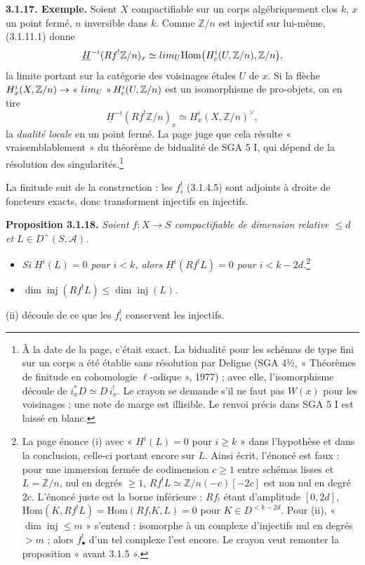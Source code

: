 \documentclass[11pt,a4paper]{article}
\begin{document}
\textbf{3.1.17. Exemple.} Soient $X$ compactifiable sur un corps
algébriquement clos $k$, $x$ un point fermé, $n$ inversible dans $k$. Comme
$\mathbb{Z}/n$ est injectif sur lui-même, (3.1.11.1) donne
\[
\underline{H}^{-i}(Rf^!\mathbb{Z}/n)_x \simeq \varinjlim_{U}
\mathrm{Hom}\bigl(H^i_c(U, \mathbb{Z}/n), \mathbb{Z}/n\bigr),
\]
la limite portant sur la catégorie des voisinages étales $U$ de $x$. Si
la flèche $H^i_x(X, \mathbb{Z}/n) \to \text{« }\varprojlim_U\text{ »}\,
H^i_c(U, \mathbb{Z}/n)$ est un isomorphisme de pro-objets, on en tire
\[
\underline{H}^{-i}(Rf^!\mathbb{Z}/n)_x \simeq H^i_x(X, \mathbb{Z}/n)^{\vee},
\]
la \emph{dualité locale} en un point fermé. La page juge que cela résulte
« vraisemblablement » du théorème de bidualité de SGA 5 I, qui dépend de la
résolution des singularités.\footnote{À la date de la page, c'était exact.
La bidualité pour les schémas de type fini sur un corps a été établie sans
résolution par Deligne (SGA 4½, « Théorèmes de finitude en cohomologie
$\ell$-adique », 1977) ; avec elle, l'isomorphisme découle de $i_x^*D \simeq
D\,i_x^!$. Le crayon se demande s'il ne faut pas $W(x)$ pour les voisinages ;
une note de marge est illisible. Le renvoi précis dans SGA 5 I est laissé en
blanc.}

La finitude suit de la construction : les $f^!_i$ (3.1.4.5) sont adjoints à
droite de foncteurs exacts, donc transforment injectifs en injectifs.

\textbf{Proposition 3.1.18.} \emph{Soient $f\colon X \to S$ compactifiable
de dimension relative $\leqslant d$ et $L \in D^+(S, \mathcal{A})$.}
\begin{itemize}
\item[(i)] \emph{Si $\underline{H}^i(L) = 0$ pour $i < k$, alors
$\underline{H}^i(Rf^!L) = 0$ pour $i < k - 2d$.}\footnote{La page énonce (i) avec « $\underline{H}^i(L) = 0$ pour $i
\geqslant k$ » dans l'hypothèse et dans la conclusion, celle-ci portant encore
sur $L$. Ainsi écrit, l'énoncé est faux : pour une immersion fermée de
codimension $c \geqslant 1$ entre schémas lisses et $L = \mathbb{Z}/n$, nul en
degrés $\geqslant 1$, $Rf^!L \simeq \mathbb{Z}/n(-c)[-2c]$ est non nul en degré
$2c$. L'énoncé juste est la borne inférieure : $Rf_!$ étant d'amplitude
$[0, 2d]$, $\mathrm{Hom}(K, Rf^!L) = \mathrm{Hom}(Rf_!K, L) = 0$ pour $K \in
D^{<k-2d}$. Pour (ii), « $\dim\operatorname{inj} \leqslant m$ » s'entend :
isomorphe à un complexe d'injectifs nul en degrés $> m$ ; alors $f^!_{\bullet}$
d'un tel complexe l'est encore. Le crayon veut remonter la proposition « avant
3.1.5 ».}
\item[(ii)] $\dim\operatorname{inj}(Rf^!L) \leqslant
\dim\operatorname{inj}(L)$.
\end{itemize} (ii) découle de ce que les $f^!_i$ conservent les injectifs.
\end{document}

